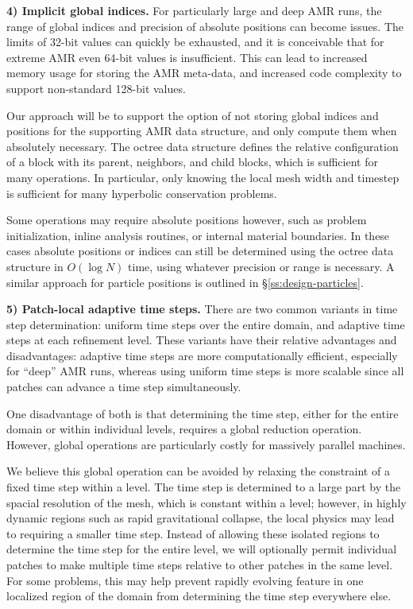 \documentclass[10pt,twocolumn]{article}
\begin{document}
\textbf{4) Implicit global indices.}  For particularly large and deep
AMR runs, the range of global indices and precision of absolute
positions can become issues.  The limits of 32-bit values can quickly
be exhausted, and it is conceivable that for extreme AMR even 64-bit
values is insufficient.  This can lead to increased memory usage for
storing the AMR meta-data, and increased code complexity to support
non-standard 128-bit values.

Our approach will be to support the option of not storing global
indices and positions for the supporting AMR data structure, and only
compute them when absolutely necessary.  The octree data structure
defines the relative configuration of a block with its parent,
neighbors, and child blocks, which is sufficient for many operations.
In particular, only knowing the local mesh width and timestep is
sufficient for many hyperbolic conservation problems.

Some operations may require absolute positions however, such as
problem initialization, inline analysis routines, or internal material
boundaries.  In these cases absolute positions or indices can still be
determined using the octree data structure in $O(\log N)$ time, using
whatever precision or range is necessary.  A similar approach for
particle positions is outlined in \S\ref{ss:design-particles}.



\textbf{5) Patch-local adaptive time steps.} There are two common
variants in time step determination: uniform time steps over the
entire domain, and adaptive time steps at each refinement level.
These variants have their relative advantages and disadvantages:
adaptive time steps are more computationally efficient, especially for
``deep'' AMR runs, whereas using uniform time steps is more scalable
since all patches can advance a time step simultaneously.

One disadvantage of both is that determining the time step, either for
the entire domain or within individual levels, requires a global
reduction operation.  However, global operations are particularly costly for
massively parallel machines.  

We believe this global operation can be avoided by relaxing the
constraint of a fixed time step within a level.  The time step is
determined to a large part by the spacial resolution of the mesh,
which is constant within a level; however, in highly dynamic regions
such as rapid gravitational collapse, the local physics may lead to
requiring a smaller time step.  Instead of allowing these isolated
regions to determine the time step for the entire level, we will
optionally permit individual patches to make multiple time steps
relative to other patches in the same level.  For some problems, this
may help prevent rapidly evolving feature in one localized region of
the domain from determining the time step everywhere else.
\end{document}
